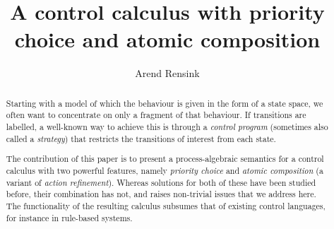 \title{A control calculus with priority choice and atomic composition}
\author{Arend Rensink}
\maketitle

\begin{abstract}
Starting with a model of which the behaviour is given in the form of a state space, we often want to concentrate on only a fragment of that behaviour. If transitions are labelled, a well-known way to achieve this is through a \emph{control program} (sometimes also called a \emph{strategy}) that restricts the transitions of interest from each state.

The contribution of this paper is to present a process-algebraic semantics for a control calculus with two powerful features, namely \emph{priority choice} and \emph{atomic composition} (a variant of \emph{action refinement}). Whereas solutions for both of these have been studied before, their combination has not, and raises non-trivial issues that we address here. The functionality of the resulting calculus subsumes that of existing control languages, for instance in rule-based systems.
\end{abstract}
